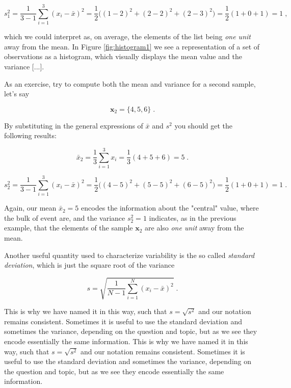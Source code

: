 \documentclass{book}
\begin{document}
\begin{equation}
s_1^2 = \frac{1}{3 - 1} \sum_{i = 1}^{3} (x_{i} - \bar{x})^{2} = \frac{1}{2} \big((1 - 2)^{2} + (2 - 2)^{2} + (2 - 3)^{2}\big) = \frac{1}{2} (1 + 0 + 1) = 1 \; , \nonumber
\end{equation}

which we could interpret as, on average, the elements of the list being \textit{one unit} away from the mean. In Figure \ref{fig:histogram1} we see a representation of a set of observations as a histogram, which visually displays the mean value and the variance [...].

\medskip

As an exercise, try to compute both the mean and variance for a second sample, let's say

\begin{equation}
\textbf{x}_2 = \{4, 5, 6\} \; . \nonumber
\end{equation}

By substituting in the general expressions of $\bar{x}$ and $s^2$ you should get the following results: 

\begin{equation}
\bar{x}_2 = \frac{1}{3} \sum_{i = 1}^{3} x_{i} = \frac{1}{3} (4 + 5 + 6) = 5 \; . \nonumber
\end{equation}

\begin{equation}
s^2_2 = \frac{1}{3 - 1} \sum_{i = 1}^{3} (x_{i} - \bar{x})^{2} = \frac{1}{2} \big((4 - 5)^{2} + (5 - 5)^{2} + (6 - 5)^{2}\big) = \frac{1}{2} (1 + 0 + 1) = 1 \; . \nonumber
\end{equation}

Again, our mean $\bar{x}_2 = 5$ encodes the information about the "central" value, where the bulk of event are, and the variance $s^2_2 = 1$ indicates, as in the previous example, that the elements of the sample $\textbf{x}_2$ are also \textit{one unit} away from the mean.

\medskip

Another useful quantity used to characterize variability is the so called \textit{standard deviation}, which is just the square root of the variance

\begin{equation}
s = \sqrt{\frac{1}{N - 1} \sum_{i = 1}^{N} (x_{i} - \bar{x})^{2}} \; . 
\end{equation}

This is why we have named it in this way, such that $s = \sqrt{s^{2}}$ and our notation remains consistent. Sometimes it is useful to use the standard deviation and sometimes the variance, depending on the question and topic, but as we see they encode essentially the same information. This is why we have named it in this way, such that $s = \sqrt{s^{2}}$ and our notation remains consistent. Sometimes it is useful to use the standard deviation and sometimes the variance, depending on the question and topic, but as we see they encode essentially the same information.
\end{document}

